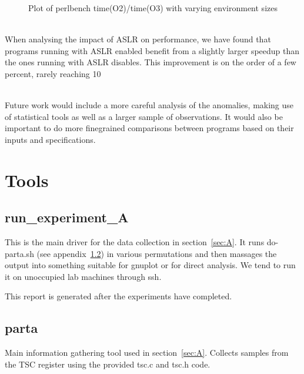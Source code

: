 \documentclass{article}
\begin{document}
\begin{figure}[h]
    \caption{Plot of perlbench time(O2)/time(O3) with varying environment sizes}
    
\end{figure}


\\

When analysing the impact of ASLR on performance, we have found that programs running with ASLR enabled benefit from a slightly larger speedup than the ones running with ASLR disables. This improvement is on the order of a few percent, rarely reaching 10%
\\
\begin{framed}
    \label{lst:inactive}
    
\end{framed}

\\
Future work would include a more careful analysis of the anomalies, making use of statistical tools as well as a larger sample of observations. It would also be important to do more finegrained comparisons between programs based on their inputs and specifications.

\newpage
\appendix
\section{Tools}

\subsection{run\_experiment\_A} \label{tool:run}
This is the main driver for the data collection in section~\ref{sec:A}.
It runs do-parta.sh (see appendix~\ref{tool:parta}) in various permutations
and then massages the output into something suitable for gnuplot or for direct
analysis. We tend to run it on unoccupied lab machines through ssh.

This report is generated after the experiments have completed.


\subsection{parta} \label{tool:parta}
Main information gathering tool used in section~\ref{sec:A}. Collects samples
from the TSC register using the provided tsc.c and tsc.h code.
\begin{framed}
    \label{lst:parta}
    
\end{framed}
\end{document}
